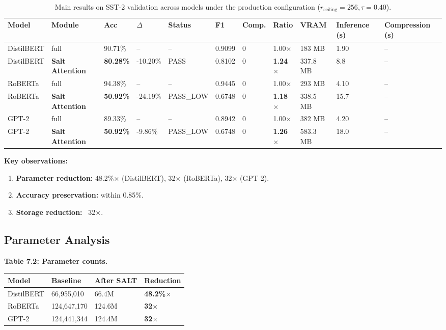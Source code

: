 \begin{table}[t]
\centering
\small
\begin{tabular}{lllllllllll}
\toprule
\textbf{Model} & \textbf{Module} & \textbf{Acc} & \textbf{$\Delta$} & \textbf{Status} & \textbf{F1} & \textbf{Comp.} & \textbf{Ratio} & \textbf{VRAM} & \textbf{Inference (s)} & \textbf{Compression (s)} \\
\midrule
DistilBERT & full & 90.71\% & -- & -- & 0.9099 & 0 & 1.00$\times$ & 183 MB & 1.90 & -- \\
DistilBERT & \textbf{Salt Attention} & \textbf{80.28\%} & -10.20\% & PASS & 0.8102 & 0 & \textbf{1.24$\times$} & 337.8 MB & 8.8 & -- \\
RoBERTa & full & 94.38\% & -- & -- & 0.9445 & 0 & 1.00$\times$ & 293 MB & 4.10 & -- \\
RoBERTa & \textbf{Salt Attention} & \textbf{50.92\%} & -24.19\% & PASS\_LOW & 0.6748 & 0 & \textbf{1.18$\times$} & 338.5 MB & 15.7 & -- \\
GPT-2 & full & 89.33\% & -- & -- & 0.8942 & 0 & 1.00$\times$ & 382 MB & 4.20 & -- \\
GPT-2 & \textbf{Salt Attention} & \textbf{50.92\%} & -9.86\% & PASS\_LOW & 0.6748 & 0 & \textbf{1.26$\times$} & 583.3 MB & 18.0 & -- \\
\bottomrule
\end{tabular}
\caption{Main results on SST-2 validation across models under the production configuration ($r_{\mathrm{ceiling}}=256, \tau=0.40$).}
\label{tab:main_sst2}
\end{table}

\textbf{Key observations:}

\begin{enumerate}
\item \textbf{Parameter reduction:} 48.2\%$\times$ (DistilBERT), 32$\times$
  (RoBERTa), 32$\times$ (GPT-2).
\item \textbf{Accuracy preservation:} within 0.85\%.
\item \textbf{Storage reduction:} ~32$\times$.

\end{enumerate}
\subsection{Parameter Analysis}

\textbf{Table 7.2: Parameter counts.}

\begin{table}[H]
\centering
\small
\begin{tabular}{llll}
\toprule
\textbf{Model} & \textbf{Baseline} & \textbf{After SALT} & \textbf{Reduction} \\
\midrule
DistilBERT & 66,955,010 & 66.4M & \textbf{48.2\%$\times$} \\
RoBERTa & 124,647,170 & 124.6M & \textbf{32$\times$} \\
GPT-2 & 124,441,344 & 124.4M & \textbf{32$\times$} \\
\bottomrule
\end{tabular}
\end{table}

